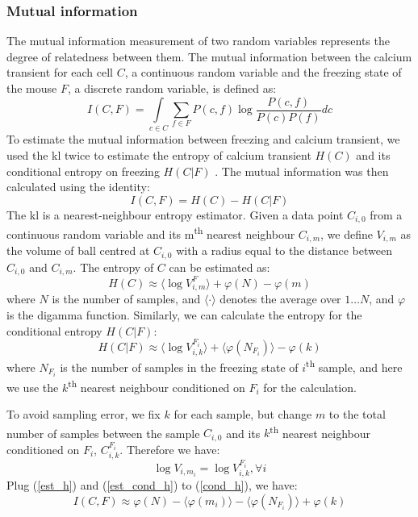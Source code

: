 \subsubsection{Mutual information}

The mutual information measurement of two random variables represents the degree of relatedness between them. The mutual information between the calcium transient for each cell $C$, a continuous random variable and the freezing state of the mouse $F$, a discrete random variable, is defined as:
\begin{equation*}
    I(C, F) = \int\limits_{c \in C} \sum_{f \in F} P(c,f)\log\frac{P(c,f)}{P(c)P(f)}dc
\end{equation*}
To estimate the mutual information between freezing and calcium transient, we used the \gls{kl} twice to estimate the entropy of calcium transient $H(C)$ and its conditional entropy on freezing $H(C|F)$ \citep{ross14, victor02}. The mutual information was then calculated using the identity:
\begin{equation} \label{cond_h}
    I(C, F) = H(C) - H(C|F)
\end{equation}
The \gls{kl} is a nearest-neighbour entropy estimator. Given a data point $C_{i,0}$ from a continuous random variable and its m\textsuperscript{th} nearest neighbour $C_{i,m}$, we define $V_{i,m}$ as the volume of ball centred at $C_{i,0}$ with a radius equal to the distance between $C_{i,0}$ and $C_{i,m}$. The entropy of $C$ can be estimated as:
\begin{equation} \label{est_h}
    H(C) \approx \langle \log V_{i,m}^F\rangle + \varphi(N) - \varphi(m)
\end{equation}
where $N$ is the number of samples, and $\langle\cdot\rangle$ denotes the average over $1\ldots N$, and $\varphi$ is the digamma function. Similarly, we can calculate the entropy for the conditional entropy $H(C|F)$:
\begin{equation} \label{est_cond_h}
    H(C|F) \approx \langle \log V_{i,k}^{F_i} \rangle + \langle \varphi(N_{F_i}) \rangle - \varphi(k)
\end{equation}
where $N_{F_i}$ is the number of samples in the freezing state of $i$\textsuperscript{th} sample, and here we use the $k$\textsuperscript{th} nearest neighbour conditioned on $F_i$ for the calculation.

To avoid sampling error, we fix $k$ for each sample, but change $m$ to the total number of samples between the sample $C_{i,0}$ and its $k$\textsuperscript{th} nearest neighbour conditioned on $F_i$, $C_{i,k}^{F_i}$. Therefore we have:
\begin{equation*}
\log V_{i, m_i} = \log V_{i, k}^{F_i}, \forall i 
\end{equation*}
Plug (\ref{est_h}) and (\ref{est_cond_h}) to (\ref{cond_h}), we have:
\begin{equation*}
    I(C, F) \approx \varphi(N) - \langle\varphi(m_i)\rangle - \langle\varphi(N_{F_i})\rangle + \varphi(k)
\end{equation*}





